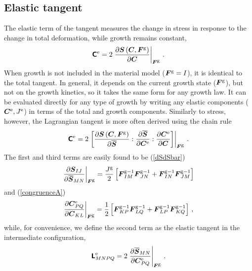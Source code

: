 \documentclass[10pt,letterpaper,oneside]{report}
\newcommand{\ten}[1]{\mbox{\boldmath $#1$}{}}
\newcommand{\tenf}[1]{\mbox{{\sffamily{\bfseries {#1}}}}}
\newcommand{\scas}[1]{\mbox{{\scriptsize{${\rm{#1}}$}}}{}}
\newcommand{\tens}[1]{\mbox{\boldmath{\scriptsize{$#1$}}}{}}
\begin{document}
\subsection{Elastic tangent} 
The elastic term of the tangent measures the change in stress in response to the change in total deformation, while growth remains constant, 
\begin{equation}
\tenf{C}^{\scas{e}} = 2 \left. \frac{ \partial \ten{S} \left( \ten{C}, \ten{F}^{\scas{g}} \right) }{ \partial \ten{C} } \right|_{\tens{F}^{\scas{g}}} \, . 
\end{equation}
When growth is not included in the material model ($\ten{F}^{\scas{g}} = I$), it is identical to the total tangent. In general, it depends on the current growth state ($\ten{F}^{\scas{g}}$), but not on the growth kinetics, so it takes the same form for any growth law.  It can be evaluated directly for any type of growth by writing any elastic components ($\ten{C}^{\scas{e}}, J^{\scas{e}}$) in terms of the total and growth components.  Similarly to stress, however, the Lagrangian tangent is more often derived using the chain rule
\begin{equation}
\tenf{C}^{\scas{e}} = 2 \left. \left[ \frac{ \partial \ten{S} \left( \ten{C}, \ten{F}^{\scas{g}} \right) }{ \partial \overline{\ten{S}} } : \frac{ \partial \overline{\ten{S}} }{ \partial \ten{C}^{\scas{e}} } : \frac{ \partial \ten{C}^{\scas{e} } }{ \partial \ten{C} } \right] \right|_{\tens{F}^{\scas{g}}} \, .
\end{equation}
The first and third terms are easily found to be (\autoref{dSdSbar})
\begin{equation}
\left. \frac{ \partial \ten{S}_{IJ} }{ \partial \overline{\ten{S}}_{MN} } \right|_{\tens{F}^{\scas{g}}} 
= \frac{J^{\scas{g}}}{2} \left[ \ten{F}^{\scas{g}-1}_{IM} \ten{F}^{\scas{g}-1}_{JN} + \ten{F}^{\scas{g}-1}_{IN} \ten{F}^{\scas{g}-1}_{JM} \right]  
\end{equation}
and (\autoref{congruenceA})
\begin{equation}
\left. \frac{ \partial \ten{C}^{\scas{e}}_{PQ} }{ \partial \ten{C}_{KL} } \right|_{\tens{F}^{\scas{g}}} 
= \frac{1}{2} \left[ \ten{F}^{\scas{g}-1}_{KP} \ten{F}^{\scas{g}-1}_{LQ} 
+ \ten{F}^{\scas{g}-1}_{LP} \ten{F}^{\scas{g}-1}_{KQ} \right] \, , 
\end{equation}
while, for convenience, we define the second term as the elastic tangent in the intermediate configuration,
\begin{equation}
\tenf{L}^{\scas{e}}_{MNPQ} = 2 \left. \frac{\partial \overline{\ten{S}}_{MN} }{\partial \ten{C}^{\scas{e}}_{PQ} } \right|_{\tens{F}^{\scas{g}}} \, .
\label{Le}
\end{equation}
\end{document}
